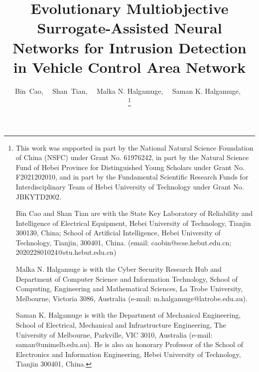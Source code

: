 \documentclass[lettersize,journal]{IEEEtran}
\begin{document}
\title{Evolutionary Multiobjective Surrogate-Assisted Neural Networks for Intrusion Detection in Vehicle Control Area Network}

\author{
         Bin~Cao,~
         ~Shan~Tian,~\IEEEmembership{}
         ~Malka N. Halgamuge,~
         ~Saman K. Halgamuge,~


\thanks{This work was supported in part by the National Natural Science Foundation of China (NSFC) under Grant No. 61976242, in part by the Natural Science Fund of Hebei Province for Distinguished Young Scholars under Grant No. F2021202010, and in part by the Fundamental Scientific Research Funds for Interdisciplinary Team of Hebei University of Technology under Grant No. JBKYTD2002.

Bin Cao and Shan Tian are with the State Key Laboratory of Reliability and Intelligence of Electrical Equipment, Hebei University of Technology, Tianjin 300130, China; School of Artificial Intelligence, Hebei University of Technology, Tianjin, 300401, China. (email: caobin@scse.hebut.edu.cn; 202022801024@stu.hebut.edu.cn)

Malka N. Halgamuge is with the Cyber Security Research Hub and Department of Computer Science and Information Technology, School of Computing, Engineering and Mathematical Sciences, La Trobe University, Melbourne, Victoria 3086, Australia (e-mail: m.halgamuge@latrobe.edu.au).

Saman K. Halgamuge is with the Department of Mechanical Engineering, School of Electrical, Mechanical and Infrastructure Engineering, The University of Melbourne, Parkville, VIC 3010, Australia (e-mail: saman@unimelb.edu.au). He is also an honorary Professor of the School of Electronics and Information Engineering, Hebei University of Technology, Tianjin 300401, China.

}
}
%

\end{document}
